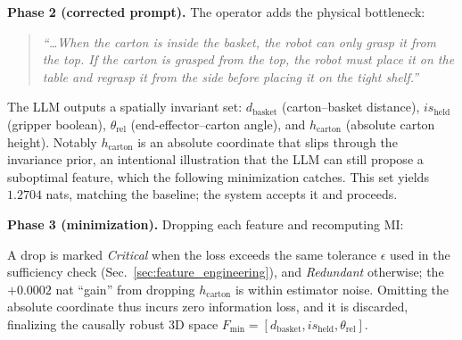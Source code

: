 \textbf{Phase 2 (corrected prompt).} The operator adds the physical bottleneck:
\begin{quote}\small\itshape ``\dots When the carton is inside the basket, the robot can only grasp it from the top. If the carton is grasped from the top, the robot must place it on the table and regrasp it from the side before placing it on the tight shelf.''\end{quote}
The LLM outputs a spatially invariant set: $d_{\text{basket}}$ (carton--basket distance), $is_{\text{held}}$ (gripper boolean), $\theta_{\text{rel}}$ (end-effector--carton angle), and $h_{\text{carton}}$ (absolute carton height). Notably $h_{\text{carton}}$ is an absolute coordinate that slips through the invariance prior, an intentional illustration that the LLM can still propose a suboptimal feature, which the following minimization catches. This set yields $1.2704$ nats, matching the baseline; the system accepts it and proceeds.

\textbf{Phase 3 (minimization).} Dropping each feature and recomputing MI:
\begin{center}
\end{center}
A drop is marked \emph{Critical} when the loss exceeds the same tolerance $\epsilon$ used in the sufficiency check (Sec.~\ref{sec:feature_engineering}), and \emph{Redundant} otherwise; the $+0.0002$ nat ``gain'' from dropping $h_{\text{carton}}$ is within estimator noise. Omitting the absolute coordinate thus incurs zero information loss, and it is discarded, finalizing the causally robust 3D space $F_{\min}=[d_{\text{basket}},is_{\text{held}},\theta_{\text{rel}}]$.

